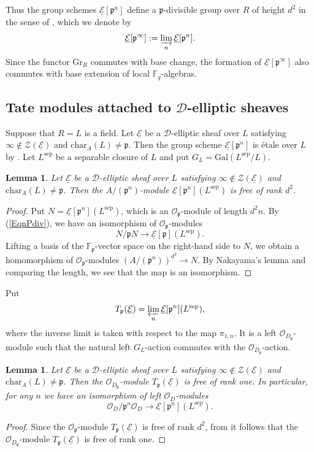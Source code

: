 \documentclass[10pt]{amsart}
\theoremstyle{plain}
\newtheorem{lem}[thm]{Lemma}
\theoremstyle{definition}
\newcommand{\chr}{\mathrm{char}}
\newcommand{\Gal}{\mathrm{Gal}}
\newcommand{\sep}{\mathrm{sep}}
\newcommand{\cO}{\mathcal{O}}
\newcommand{\cZ}{\mathcal{Z}}
\newcommand{\Gr}{\mathrm{Gr}}
\newcommand{\ucE}{\underline{\mathcal{E}}}
\newcommand{\bF}{\mathbb{F}}
\newcommand{\sD}{\mathscr{D}}
\newcommand{\frp}{\mathfrak{p}}
\begin{document}
Thus the group schemes $\ucE[\frp^n]$ define a $\frp$-divisible group over $R$ of height $d^2$ in the sense of \cite[\S1.2]{Tag_ss},
which we denote by
\[
\ucE[\frp^\infty]:=\varinjlim_n \ucE[\frp^n].
\]
Since the functor $\Gr_R$ commutes with base change, the formation of $\ucE[\frp^\infty]$ also commutes with base extension of 
local $\bF_q$-algebras.





\subsection{Tate modules attached to $\sD$-elliptic sheaves}\label{SubsecTateMod}

Suppose that $R=L$ is a field. Let $\ucE$ be a $\sD$-elliptic sheaf over $L$ satisfying $\infty\notin \cZ(\ucE)$ and $\chr_A(L)\neq \frp$.
Then the group scheme $\ucE[\frp^n]$ is \'{e}tale over $L$ by \cite[Proposition 2.1]{Dri_F}.
Let $L^\sep$ be a separable closure of $L$ and put $G_L=\Gal(L^\sep/L)$. 



\begin{lem}\label{LemEPfree}
	Let $\ucE$ be a $\sD$-elliptic sheaf over $L$ satisfying $\infty\notin \cZ(\ucE)$ and $\chr_A(L)\neq \frp$.
	Then the $A/(\frp^n)$-module $\ucE[\frp^n](L^\sep)$ is free of rank $d^2$.
\end{lem}
\begin{proof}
	Put $N=\ucE[\frp^n](L^\sep)$, which is an $\cO_\frp$-module of length $d^2n$.
	By (\ref{EqnPdiv}), we have an isomorphism of $\cO_\frp$-modules
	\[
	N/\frp N\to \ucE[\frp](L^\sep).
	\]
	Lifting a basis of the $\bF_\frp$-vector space on the right-hand side to $N$, we obtain a homomorphism of $\cO_\frp$-modules $(A/(\frp^n))^{d^2}\to N$.
	By Nakayama's lemma and comparing the length, we see that the map is an isomorphism.
\end{proof}

Put
\[
T_\frp(\ucE)=\varprojlim_n \ucE[\frp^n](L^\sep),
\]
where the inverse limit is taken with respect to the map $\pi_{1,n}$. It is a left $\cO_{D_\frp}$-module 
such that the natural left $G_L$-action commutes with the $\cO_{D_\frp}$-action. 

\begin{lem}\label{LemTPfree}
	Let $\ucE$ be a $\sD$-elliptic sheaf over $L$ satisfying $\infty\notin \cZ(\ucE)$ and $\chr_A(L)\neq \frp$.
	Then the $\cO_{D_\frp}$-module $T_\frp(\ucE)$ is free of rank one. In particular, for any $n$ we have an isomorphism of left $\cO_D$-modules
	\[
	\cO_D/\frp^n\cO_D\to \ucE[\frp^n](L^\sep).
	\]
\end{lem}
\begin{proof}
	Since the $\cO_\frp$-module $T_\frp(\ucE)$ is free of rank $d^2$,
	from \cite[Theorem 18.7]{Rei} it follows that the $\cO_{D_\frp}$-module $T_\frp(\ucE)$ is free of rank one.
\end{proof}
\end{document}
